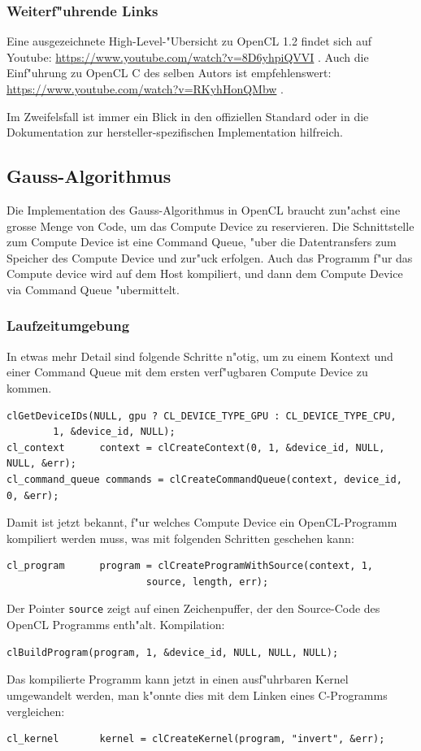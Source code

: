 \subsubsection{Weiterf"uhrende Links}
Eine ausgezeichnete High-Level-"Ubersicht zu OpenCL 1.2 findet sich auf Youtube:
\url{https://www.youtube.com/watch?v=8D6yhpiQVVI} \cite{skript:opencl-overview}.
Auch die Einf"uhrung zu OpenCL C des selben Autors ist empfehlenswert:
\url{https://www.youtube.com/watch?v=RKyhHonQMbw} \cite{skript:opencl-c}.

Im Zweifelsfall ist immer ein Blick in den offiziellen
Standard\cite{skript:opencl} oder in die Dokumentation zur
hersteller-spezifischen Implementation hilfreich.


\subsection{Gauss-Algorithmus}
Die Implementation des Gauss-Algorithmus in OpenCL braucht zun"achst eine
grosse Menge von Code, um das Compute Device zu reservieren.
Die Schnittstelle zum Compute Device ist eine Command Queue,
"uber die Datentransfers zum Speicher des Compute Device und zur"uck
erfolgen.
Auch das Programm f"ur das Compute device wird auf dem
Host kompiliert, und dann dem Compute Device via Command Queue
"ubermittelt.

\subsubsection{Laufzeitumgebung}
In etwas mehr Detail sind folgende Schritte n"otig, um zu einem
Kontext und einer Command Queue mit dem ersten verf"ugbaren
Compute Device zu kommen.
\begin{verbatim}
clGetDeviceIDs(NULL, gpu ? CL_DEVICE_TYPE_GPU : CL_DEVICE_TYPE_CPU,
        1, &device_id, NULL);
cl_context      context = clCreateContext(0, 1, &device_id, NULL, NULL, &err);
cl_command_queue commands = clCreateCommandQueue(context, device_id, 0, &err);
\end{verbatim}
Damit ist jetzt bekannt, f"ur welches Compute Device ein OpenCL-Programm
kompiliert werden muss, was mit folgenden Schritten geschehen kann:
\begin{verbatim}
cl_program      program = clCreateProgramWithSource(context, 1,
                        source, length, err);
\end{verbatim}
Der Pointer \verb+source+ zeigt auf einen Zeichenpuffer, der den Source-Code
des OpenCL Programms enth"alt. Kompilation:
\begin{verbatim}
clBuildProgram(program, 1, &device_id, NULL, NULL, NULL);
\end{verbatim}
Das kompilierte Programm kann jetzt in einen ausf"uhrbaren
Kernel umgewandelt werden, man k"onnte dies mit dem Linken eines
C-Programms vergleichen:
\begin{verbatim}
cl_kernel       kernel = clCreateKernel(program, "invert", &err);
\end{verbatim}

